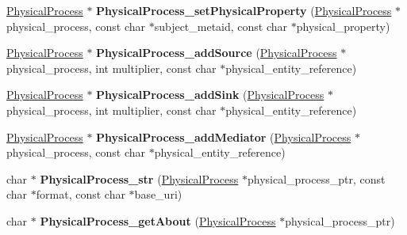 \begin{DoxyCompactItemize}
\item 
\mbox{\label{namespaceomexmeta_ae0e715da1275124448d22005f2848722}} 
\hyperlink{classomexmeta_1_1PhysicalProcess}{Physical\+Process} $\ast$ {\bfseries Physical\+Process\+\_\+set\+Physical\+Property} (\hyperlink{classomexmeta_1_1PhysicalProcess}{Physical\+Process} $\ast$physical\+\_\+process, const char $\ast$subject\+\_\+metaid, const char $\ast$physical\+\_\+property)
\item 
\mbox{\label{namespaceomexmeta_a08408524a5a4f75ae4b0c1c8cad6c28e}} 
\hyperlink{classomexmeta_1_1PhysicalProcess}{Physical\+Process} $\ast$ {\bfseries Physical\+Process\+\_\+add\+Source} (\hyperlink{classomexmeta_1_1PhysicalProcess}{Physical\+Process} $\ast$physical\+\_\+process, int multiplier, const char $\ast$physical\+\_\+entity\+\_\+reference)
\item 
\mbox{\label{namespaceomexmeta_a68d8b919e923231d8a17e3506dca393b}} 
\hyperlink{classomexmeta_1_1PhysicalProcess}{Physical\+Process} $\ast$ {\bfseries Physical\+Process\+\_\+add\+Sink} (\hyperlink{classomexmeta_1_1PhysicalProcess}{Physical\+Process} $\ast$physical\+\_\+process, int multiplier, const char $\ast$physical\+\_\+entity\+\_\+reference)
\item 
\mbox{\label{namespaceomexmeta_a1554e14b6f4401341fa0e7f23f6d4c90}} 
\hyperlink{classomexmeta_1_1PhysicalProcess}{Physical\+Process} $\ast$ {\bfseries Physical\+Process\+\_\+add\+Mediator} (\hyperlink{classomexmeta_1_1PhysicalProcess}{Physical\+Process} $\ast$physical\+\_\+process, const char $\ast$physical\+\_\+entity\+\_\+reference)
\item 
\mbox{\label{namespaceomexmeta_ae79e87b864da4b401488f522bb6734e7}} 
char $\ast$ {\bfseries Physical\+Process\+\_\+str} (\hyperlink{classomexmeta_1_1PhysicalProcess}{Physical\+Process} $\ast$physical\+\_\+process\+\_\+ptr, const char $\ast$format, const char $\ast$base\+\_\+uri)
\item 
\mbox{\label{namespaceomexmeta_a738e9d39898919fb01bd9a7ed5af3687}} 
char $\ast$ {\bfseries Physical\+Process\+\_\+get\+About} (\hyperlink{classomexmeta_1_1PhysicalProcess}{Physical\+Process} $\ast$physical\+\_\+process\+\_\+ptr)
\item 

\end{DoxyCompactItemize}
